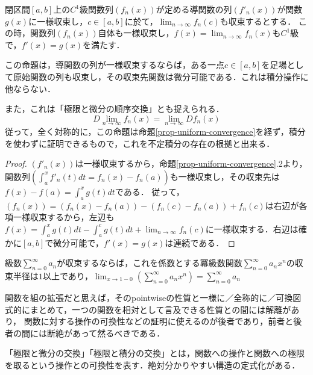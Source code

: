 \documentclass[uplatex, dvipdfmx]{jsreport}
\begin{document}
\begin{corollary}[極限と微分の順序交換]
    閉区間$[a,b]$上の$C^1$級関数列$(f_n(x))$が定める導関数の列$(f'_n(x))$が関数$g(x)$に一様収束し，$c\in [a,b]$に於て，$\lim_{n\to\infty}f_n(c)$も収束するとする．
    この時，関数列$(f_n(x))$自体も一様収束し，$f(x)=\lim_{n\to\infty}f_n(x)$も$C^1$級で，$f'(x)=g(x)$を満たす．
\end{corollary}
\begin{remark*}
    この命題は，導関数の列が一様収束するならば，ある一点$c\in [a,b]$を足場として原始関数の列も収束し，その収束先関数は微分可能である．これは積分操作に他ならない．

    また，これは「極限と微分の順序交換」とも捉えられる．
    \[ D\lim_{n\to\infty}f_n(x)=\lim_{n\to\infty}Df_n(x) \]
    従って，全く対称的に，この命題は命題\ref{prop-uniform-convergence}を経ず，積分を使わずに証明できるもので，これを不定積分の存在の根拠と出来る．
\end{remark*}
\begin{proof}
    $(f'_n(x))$は一様収束するから，命題\ref{prop-uniform-convergence}.2より，関数列$( \int^x_af'_n(t)dt=f_n(x)-f_n(a) )$も一様収束し，その収束先は$f(x)-f(a)=\int^x_ag(t)dt$である．
    従って，$(f_n(x))=(f_n(x)-f_n(a))-(f_n(c)-f_n(a))+f_n(c)$は右辺が各項一様収束するから，左辺も$f(x)=\int^x_ag(t)dt-\int^c_ag(t)dt+\lim_{n\to\infty}f_n(c)$に一様収束する．右辺は確かに$[a,b]$で微分可能で，$f'(x)=g(x)$は連続である．
\end{proof}

\begin{proposition}[Abelの定理]
    級数$\sum^\infty_{n=0}a_n$が収束するならば，これを係数とする冪級数関数$\sum^\infty_{n=0}a_nx^n$の収束半径は$1$以上であり，$\lim_{x\to 1-0}\left( \sum^\infty_{n=0}a_nx^n \right)=\sum^\infty_{n=0}a_n$
\end{proposition}

\begin{proposition}
    
\end{proposition}

\begin{example}
    
\end{example}

\begin{screen}
    関数を組の拡張だと思えば，そのpointwiseの性質と一様に／全称的に／可換図式的にまとめて，一つの関数を相対として言及できる性質との間には解離があり，
    関数に対する操作の可換性などの証明に使えるのが後者であり，前者と後者の間には断絶があって然るべきである．
    
    「極限と微分の交換」「極限と積分の交換」とは，関数への操作と関数への極限を取るという操作との可換性を表す．絶対分かりやすい構造の定式化がある．
\end{screen}
\end{document}
